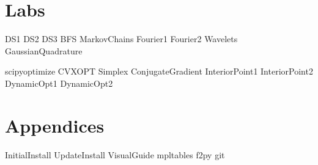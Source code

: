 \documentclass[nociteref]{SIAM-GH-book}
\begin{document}
\part{Labs} %
{DS1}
{DS2}
{DS3}
{BFS}
{MarkovChains}
{Fourier1}
{Fourier2}
{Wavelets}
{GaussianQuadrature}

{scipyoptimize}
{CVXOPT}
{Simplex}
{ConjugateGradient}
{InteriorPoint1}
{InteriorPoint2}
{DynamicOpt1}
{DynamicOpt2}

\part{Appendices} %
\begin{appendices}
{InitialInstall}
{UpdateInstall}
{VisualGuide}
{mpltables}
{f2py}
{git}
\end{appendices}
\end{document}

